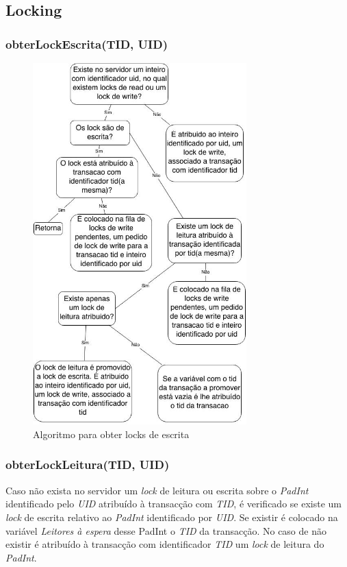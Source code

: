\subsection{Locking}

\subsubsection{obterLockEscrita(TID, UID)}

\begin{figure}[H]
\centering
\includegraphics[width=8.25cm]{obtem_lock_w.jpg}
\caption{Algoritmo para obter locks de escrita}
\end{figure}

\subsubsection{obterLockLeitura(TID, UID)}

Caso não exista no servidor um \textit{lock} de leitura ou escrita sobre o \textit{PadInt} identificado pelo \textit{UID} atribuído à transacção com \textit{TID}, é verificado se existe um \textit{lock} de escrita relativo ao \textit{PadInt} identificado por \textit{UID}. Se existir é colocado na variável \textit{Leitores à espera} desse PadInt o \textit{TID} da transacção. No caso de não existir é atribuído à transacção com identificador \textit{TID} um \textit{lock} de leitura do \textit{PadInt}.


